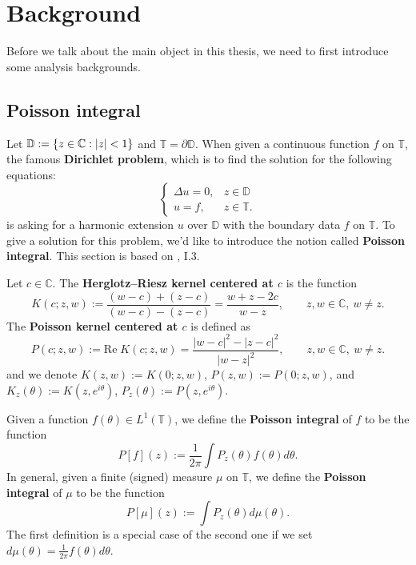 
\chapter{Background}
\label{sec:background}
Before we talk about the main object in this thesis, we need to first introduce some analysis
backgrounds.
\section{Poisson integral}
Let $\mathbb{D}:=\{z\in\mathbb{C}: |z|<1\}$ and $\mathbb{T}=\partial \mathbb{D}$. 
When given a continuous function $f$ on $\mathbb{T}$, the famous \textbf{Dirichlet
problem}, which is to find the solution for the following equations:
\begin{equation*}
  \begin{cases}
  \Delta u=0, & z\in \mathbb{D}\\
  u=f, & z\in \mathbb{T}.
  \end{cases}
\end{equation*}
is asking for a harmonic extension $u$ over $\mathbb{D}$ with the boundary data $f$ on $\mathbb{T}$.
To give a solution for this problem, we'd like to introduce the notion called \textbf{Poisson integral}.
This section is based on \cite{garnett2006bounded}, I.3.
\begin{definition}
Let $c\in\mathbb{C}$. The \textbf{Herglotz--Riesz kernel centered at $c$} is the function
\begin{equation*}
  K(c;z,w) := \frac{(w-c)+(z-c)}{(w-c)-(z-c)} = \frac{w+z-2c}{w-z},
  \qquad z,w\in\mathbb{C},\ w\neq z.
\end{equation*}
The \textbf{Poisson kernel centered at $c$} is defined as
\begin{equation*}
  P(c;z,w) := \text{Re}\; K(c;z,w)= \frac{|w-c|^2-|z-c|^2}{|w-z|^2},
  \qquad z,w\in\mathbb{C},\ w\neq z.
\end{equation*}
and we denote $K(z,w):= K(0;z,w)$, $P(z,w):= P(0;z,w)$, and $K_z(\theta):= K(z,e^{i\theta})$,
 $P_z(\theta):= P(z,e^{i\theta})$. 
\end{definition}

\begin{definition}
Given a function $f(\theta)\in L^1(\mathbb{T})$, we define the \textbf{Poisson integral} of $f$ 
to be the function
\begin{equation*}
  P[f](z):=\frac{1}{2\pi}\int P_z(\theta) f(\theta)d\theta.
\end{equation*}
In general, given a finite (signed) measure $\mu$ on $\mathbb{T}$, we define the \textbf{Poisson integral} of $\mu$
to be the function
\begin{equation*}
  P[\mu](z):=\int P_z(\theta) d\mu (\theta).
\end{equation*}
The first definition is a special case of the second one if we set 
$d\mu(\theta)=\frac{1}{2\pi} f(\theta)d\theta$.
\end{definition}

